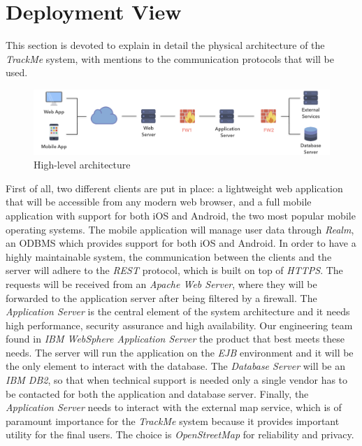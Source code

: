 \section{Deployment View}

This section is devoted to explain in detail the physical architecture of the \textit{TrackMe} system, with mentions to the communication protocols that will be used.


\begin{figure}[H]
\includegraphics[scale=0.32,keepaspectratio]{./Pictures/high-level-firewall.png}
\centering
\caption{High-level architecture}
\end{figure}

First of all, two different clients are put in place: a lightweight web application that will be accessible from any modern web browser, and a full mobile application with support for both iOS and Android, the two most popular mobile operating systems. The mobile application will manage user data through \textit{Realm}, an ODBMS which provides support for both iOS and Android. In order to have a highly maintainable system, the communication between the clients and the server will adhere to the \textit{REST} protocol, which is built on top of \textit{HTTPS}. 
The requests will be received from an \textit{Apache Web Server}, where they will be forwarded to the application server after being filtered by a firewall.
The \textit{Application Server} is the central element of the system architecture and it needs high performance, security assurance and high availability. Our engineering team found in \textit{IBM WebSphere Application Server} the product that best meets these needs. The server will run the application on the \textit{EJB} environment and it will be the only element to interact with the database. The \textit{Database Server} will be an \textit{IBM DB2}, so that when technical support is needed only a single vendor has to be contacted for both the application and database server.
Finally, the \textit{Application Server} needs to interact with the external map service, which is of paramount importance for the \textit{TrackMe} system because it provides important utility for the final users. The choice is \textit{OpenStreetMap} for reliability and privacy.

